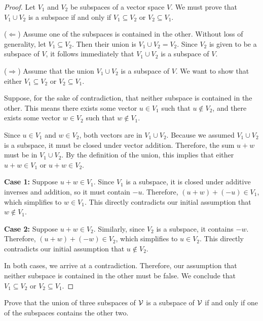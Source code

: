 \begin{proof}
	Let $V_1$ and $V_2$ be subspaces of a vector space $V$. We must prove that $V_1 \cup V_2$ is a subspace if and only if $V_1 \subseteq V_2$ or $V_2 \subseteq V_1$.
	
	($\Leftarrow$) Assume one of the subspaces is contained in the other. Without loss of generality, let $V_1 \subseteq V_2$. Then their union is $V_1 \cup V_2 = V_2$. Since $V_2$ is given to be a subspace of $V$, it follows immediately that $V_1 \cup V_2$ is a subspace of $V$.
	
	($\Rightarrow$) Assume that the union $V_1 \cup V_2$ is a subspace of $V$. We want to show that either $V_1 \subseteq V_2$ or $V_2 \subseteq V_1$. 
	
	Suppose, for the sake of contradiction, that neither subspace is contained in the other. 
	This means there exists some vector $u \in V_1$ such that $u \notin V_2$, and there exists some vector $w \in V_2$ such that $w \notin V_1$.
	
	Since $u \in V_1$ and $w \in V_2$, both vectors are in $V_1 \cup V_2$. Because we assumed $V_1 \cup V_2$ is a subspace, it must be closed under vector addition. Therefore, the sum $u + w$ must be in $V_1 \cup V_2$. 
	By the definition of the union, this implies that either $u + w \in V_1$ or $u + w \in V_2$.
	
	\textbf{Case 1:} Suppose $u + w \in V_1$. 
	Since $V_1$ is a subspace, it is closed under additive inverses and addition, so it must contain $-u$. Therefore, $(u + w) + (-u) \in V_1$, which simplifies to $w \in V_1$. This directly contradicts our initial assumption that $w \notin V_1$.
	
	\textbf{Case 2:} Suppose $u + w \in V_2$. 
	Similarly, since $V_2$ is a subspace, it contains $-w$. Therefore, $(u + w) + (-w) \in V_2$, which simplifies to $u \in V_2$. This directly contradicts our initial assumption that $u \notin V_2$.
	
	In both cases, we arrive at a contradiction. Therefore, our assumption that neither subspace is contained in the other must be false. We conclude that $V_1 \subseteq V_2$ or $V_2 \subseteq V_1$.
\end{proof}
\begin{question}
	Prove that the union of three subspaces of $\mathcal{V}$ is a subspace of $\mathcal{V}$ if and only if one of the subspaces contains the other two.
\end{question}
